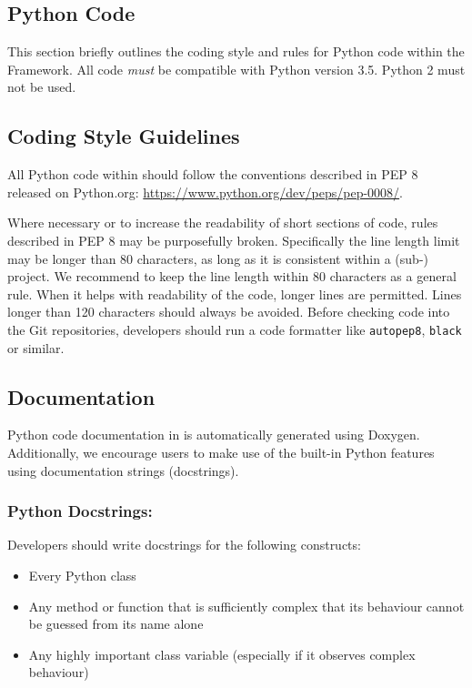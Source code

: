 \subsection{Python Code}


This section briefly outlines the coding style and rules for Python code within the \asterics Framework.
All code \textit{must} be compatible with Python version 3.5. Python 2 must not be used. 

\subsection{Coding Style Guidelines}

All Python code within \asterics should follow the conventions described in PEP 8 released on Python.org:
\url{https://www.python.org/dev/peps/pep-0008/}.

Where necessary or to increase the readability of short sections of code, rules described in PEP 8 may be purposefully broken.
Specifically the line length limit may be longer than 80 characters, as long as it is consistent within a (sub-) project.
We recommend to keep the line length within 80 characters as a general rule.
When it helps with readability of the code, longer lines are permitted.
Lines longer than 120 characters should always be avoided.
Before checking code into the Git repositories, developers should run a code formatter like \texttt{autopep8}, \texttt{black} or similar.

\subsection{Documentation}

Python code documentation in \asterics is automatically generated using Doxygen.
Additionally, we encourage users to make use of the built-in Python features using documentation strings (docstrings).

\subsubsection*{Python Docstrings:}

Developers should write docstrings for the following constructs:
\begin{itemize}
\item Every Python class
\item Any method or function that is sufficiently complex that its behaviour cannot be guessed from its name alone
\item Any highly important class variable (especially if it observes complex behaviour) 
\end{itemize}

